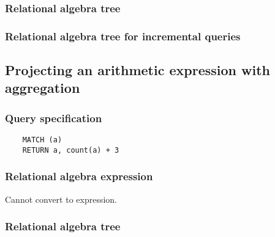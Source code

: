 	\subsubsection*{Relational algebra tree}


	\subsubsection*{Relational algebra tree for incremental queries}

	\subsection{Projecting an arithmetic expression with aggregation}

	\subsubsection*{Query specification}

	\begin{lstlisting}
	MATCH (a)
	RETURN a, count(a) + 3
	\end{lstlisting}


	\subsubsection*{Relational algebra expression}

	Cannot convert to expression.

	\subsubsection*{Relational algebra tree}

